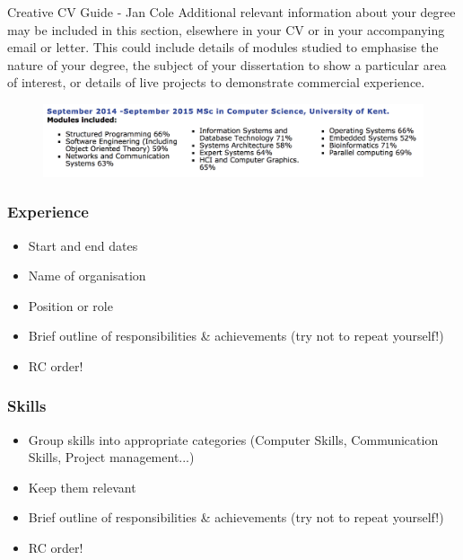 \begin{frame}
	\begin{aquote}{Creative CV Guide - Jan Cole}
	Additional relevant information about your degree may be included in this section, elsewhere in your CV or in
your accompanying email or letter. This could include details of modules studied to emphasise the nature of
your degree, the subject of your dissertation to show a particular area of interest, or details of live projects to
demonstrate commercial experience. 
  	\end{aquote}
	\begin{figure}
	\includegraphics[scale=.3]{assets/qual}
	\end{figure}
\end{frame}

\begin{frame} 
	\frametitle{Experience}
	\begin{itemize}
	 	\item Start and end dates
	 	\item Name of organisation
		\item Position or role
	 	\item Brief outline of responsibilities \& achievements (try not to repeat yourself!)
		\item RC order!
	\end{itemize}	
\end{frame}

\begin{frame} 
	\frametitle{Skills}
	\begin{itemize}
	 	\item Group skills into appropriate categories (Computer Skills, Communication Skills, Project management...)
	 	\item Keep them relevant 
	 	\item Brief outline of responsibilities \& achievements (try not to repeat yourself!)
		\item RC order!
	\end{itemize}	
\end{frame}

